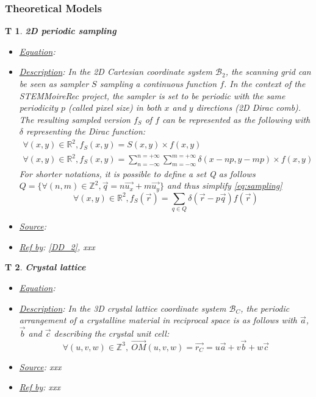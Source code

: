 \documentclass[12pt]{article}
\newcommand{\progname}{STEMMoireRec}
\newtheorem{T}{T}
\begin{document}
\subsubsection{Theoretical Models}\label{sec_theoretical}

\begin{T}
\label{T_1}
\noindent\colorbox{shadecolorT}{\normalfont \textbf{2D periodic sampling}}
\normalfont
\begin{itemize}
\item \underline{Equation}: 
\item \underline{Description}: In the 2D Cartesian coordinate system 
$\mathcal{B}_2$, the scanning grid can be seen as sampler $S$ sampling a 
continuous function $f$. In the context of the \progname{} project, the sampler 
is set to be periodic with the same periodicity $p$ (called pixel size) in both 
$x$ and $y$ directions (2D Dirac comb). The resulting sampled version $f_S$ of 
$f$ can be represented as the following with $\delta$ representing the Dirac 
function:
\begin{equation}
\begin{gathered}
\forall (x,y) \in \mathbb{R}^{2}, f_S(x,y)=S(x,y)\times f(x,y) \\
\forall (x,y) \in \mathbb{R}^{2}, 
f_S(x,y)=\sum_{n=-\infty}^{n=+\infty}\sum_{m=-\infty}^{m=+\infty}\delta(x-np,y-mp)\times 
f(x,y)
\end{gathered}
\label{eq:sampling}
\end{equation}
For shorter notations, it is possible to define a set Q as follows $Q=\{\forall 
(n,m) \in \mathbb{Z}^{2}, \vec{q}=n\vec{u_x}+m\vec{u_y}\}$ and thus simplify 
\cref{eq:sampling}
\begin{equation}
\forall (x,y) \in \mathbb{R}^{2}, f_S(\vec{r})=\sum_{q\in 
Q}\delta(\vec{r}-p\vec{q}) f(\vec{r})
\label{eq:sampling_simplified}
\end{equation}
\item \underline{Source}: \cite{Gonzalez_1992}
\item \underline{Ref by}: \cref{DD_2}, xxx
\end{itemize}
\end{T}

\begin{T}
\label{T_2}
\noindent\colorbox{shadecolorT}{\normalfont \textbf{Crystal lattice}}
\normalfont
\begin{itemize}
\item \underline{Equation}: 
\item \underline{Description}: In the 3D crystal lattice coordinate system $\mathcal{B}_C$, the periodic arrangement of a crystalline material in reciprocal space is as follows with $\vec{a}$, $\vec{b}$ and $\vec{c}$ describing the crystal unit cell:
\begin{equation}
\forall (u,v,w) \in \mathbb{Z}^{3}, \ \overrightarrow{OM}(u,v,w) = \vec{r_C} = u \vec{a} + v \vec{b} + w \vec{c} 
\label{eq:crystal_1}
\end{equation}
\item \underline{Source}: xxx
\item \underline{Ref by}: xxx
\end{itemize}
\end{T}
\end{document}
